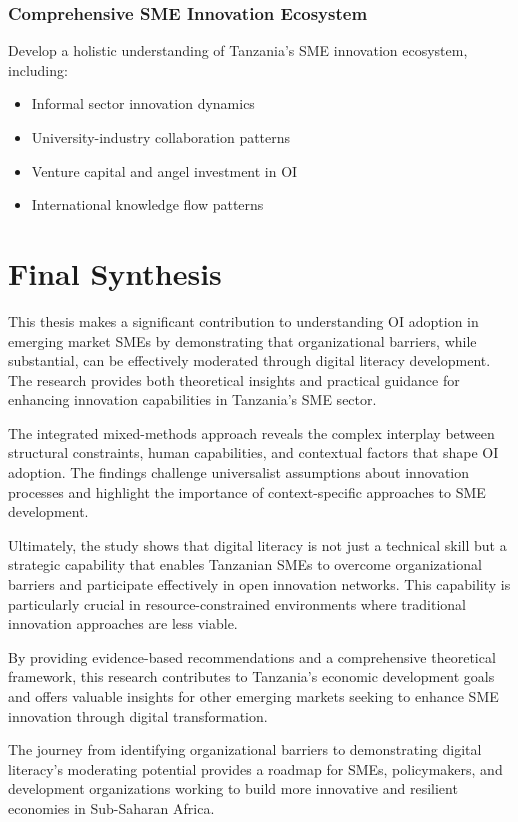 \subsubsection{Comprehensive SME Innovation Ecosystem}
Develop a holistic understanding of Tanzania's SME innovation ecosystem, including:
\begin{itemize}
    \item Informal sector innovation dynamics
    \item University-industry collaboration patterns
    \item Venture capital and angel investment in OI
    \item International knowledge flow patterns
\end{itemize}

\section{Final Synthesis}

This thesis makes a significant contribution to understanding OI adoption in emerging market SMEs by demonstrating that organizational barriers, while substantial, can be effectively moderated through digital literacy development. The research provides both theoretical insights and practical guidance for enhancing innovation capabilities in Tanzania's SME sector.

The integrated mixed-methods approach reveals the complex interplay between structural constraints, human capabilities, and contextual factors that shape OI adoption. The findings challenge universalist assumptions about innovation processes and highlight the importance of context-specific approaches to SME development.

Ultimately, the study shows that digital literacy is not just a technical skill but a strategic capability that enables Tanzanian SMEs to overcome organizational barriers and participate effectively in open innovation networks. This capability is particularly crucial in resource-constrained environments where traditional innovation approaches are less viable.

By providing evidence-based recommendations and a comprehensive theoretical framework, this research contributes to Tanzania's economic development goals and offers valuable insights for other emerging markets seeking to enhance SME innovation through digital transformation.

The journey from identifying organizational barriers to demonstrating digital literacy's moderating potential provides a roadmap for SMEs, policymakers, and development organizations working to build more innovative and resilient economies in Sub-Saharan Africa.